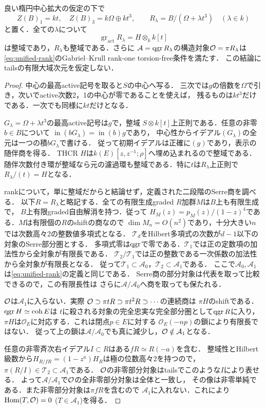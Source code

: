 \begin{proposition}[全切断での整域性と内在的rank]
\label{prop:r13-all-cut-domain-rank}
良い楕円中心拡大の仮定の下で
\[
 Z(B)_1=kt,\quad Z(B)_3=k\Omega\oplus kt^3,\qquad
 R_\lambda=B/(\Omega+\lambda t^3)\quad(\lambda\in k)
\]
と置く．全ての$\lambda$について
\[
 \operatorname{gr}_{\mathrm{act}}R_\lambda=H\otimes_k k[t]
\]
は整域であり，$R_\lambda$も整域である．さらに
$\mathcal A=\operatorname{qgr} R_\lambda$の構造対象$\mathcal O=\pi R_\lambda$は
\eqref{eq:unified-rank}のGabriel--Krull rank-one torsion-free条件を満たす．
この結論にtailsの有限大域次元を仮定しない．
\end{proposition}
\begin{proof}
中心の最高active記号を取ると$S$の中心へ写る．
三次では$g$の倍数を$\Omega$で引き，次いでactive次数2，1の中心が零であることを使えば，
残るものは$kt^3$だけである．一次でも同様に$kt$だけとなる．

$G_\lambda=\Omega+\lambda t^3$の最高active記号は$g$で，整域
$S\otimes k[t]$上正則である．任意の非零$b\in B$について
$\operatorname{in}(bG_\lambda)=\operatorname{in}(b)g$であり，
中心性からイデアル$(G_\lambda)$の全元は一つの積$bG_\lambda$で書ける．
従って初期イデアルは正確に$(g)$であり，表示の随伴商を得る．
THCR $H$は$k(E)[z,z^{-1};\rho]$へ埋め込まれるので整域である．
随伴次数付き環が整域なら元の濾過環も整域である．特に$t$は$R_\lambda$上正則で
$R_\lambda/(t)=H$となる．

rankについて，単に整域だからと結論せず，定義された二段階のSerre商を調べる．
以下$R=R_\lambda$と略記する．全ての有限生成graded $R$加群$M$は$B$上も有限生成で，
$B$上有限graded自由解消を持つ．従って
$H_M(z)=p_M(z)/(1-z)^4$である．$M$は有限個の$R$のshiftの商なので
$\dim M_n=O(n^2)$であり，十分大きい$n$では次数高々2の整数値多項式となる．
$\mathcal T_d$をHilbert多項式の次数が$d-1$以下の対象のSerre部分圏とする．
多項式零は$\operatorname{qgr}$で零である．$\mathcal T_1$では正の定数項の加法性から全対象が有限長である．
$\mathcal T_2/\mathcal T_1$では正の整数である一次係数の加法性から全対象が有限長となる．
従って$\mathcal T_1\subset\mathcal A_0$，$\mathcal T_2\subset\mathcal A_1$である．
ここで$\mathcal A_0,\mathcal A_1$は\eqref{eq:unified-rank}の定義と同じである．
Serre商の部分対象は代表を取って比較できるので，この有限長性は
さらに$\mathcal A/\mathcal A_0$へ商を取っても保たれる．

$\mathcal O$は$\mathcal A_1$に入らない．実際
$\mathcal O\supset\pi tR\supset\pi t^2R\supset\cdots$の連続商は
$\pi H$のshiftである．$\operatorname{qgr} H\simeq\operatorname{coh}E$は
$t$に殺される対象の完全忠実な完全部分圏として$\operatorname{qgr} R$に入り，
$\pi H$は$\mathcal O_E$に対応する．これは閉点$p\in E$に対する
$\mathcal O_E(-np)$の鎖により有限長ではない．
従って上の鎖は$\mathcal A/\mathcal A_0$でも真に減少し，$\mathcal O\notin\mathcal A_1$となる．

任意の非零斉次右イデアル$I\subset R$はある$fR\simeq R(-a)$を含む．
整域性とHilbert級数から$H_{R/fR}=(1-z^a)H_R$は極の位数高々2を持つので，
$\pi(R/I)\in\mathcal T_2\subset\mathcal A_1$である．
$\mathcal O$の非零部分対象はtailsでこのような$I$により表せる．
よって$\mathcal A/\mathcal A_1$で$\mathcal O$の全非零部分対象は全体と一致し，
その像は非零単純である．また非零部分対象は$\pi fR$を含むので
$\mathcal A_1$に入れない．これにより$\operatorname{Hom}(T,\mathcal O)=0$ ($T\in\mathcal A_1$)を得る．
\end{proof}


